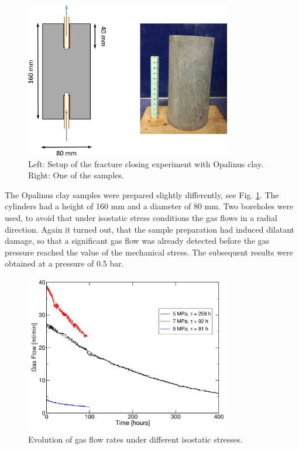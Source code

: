 \begin{figure}[!ht]
\centering
\includegraphics[width=9cm]{figures/mex3-claysample.png}
\caption{Left: Setup of the fracture closing experiment with Opalinus clay. Right: One of the samples.}
\label{fig:ME3-clay-setup}
\end{figure}

The Opalinus clay samples were prepared slightly differently, see Fig. \ref{fig:ME3-clay-setup}. The cylinders had a height of 160 mm and a diameter of 80 mm. Two boreholes were used, to avoid that under isostatic stress conditions the gas flows in a radial direction. Again it turned out, that the sample preparation had induced dilatant damage, so that a significant gas flow was already detected before the gas pressure reached the value of the mechanical stress. The subsequent results were obtained at a pressure of 0.5 bar. 

\begin{figure}[!ht]
\centering
\includegraphics[width=9cm]{figures/mex3-senkrecht-alle.png}
\caption{Evolution of gas flow rates under different isostatic stresses.}
\label{fig:ME3-clay-flows}
\end{figure}

